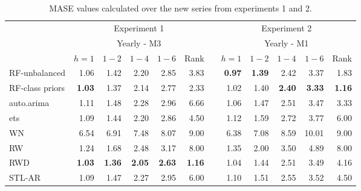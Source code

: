 \documentclass[11pt,a4paper,]{article}
\theoremstyle{definition}
\theoremstyle{definition}
\theoremstyle{definition}
\theoremstyle{remark}
\begin{document}
\begin{table}[!htbp]
\centering\footnotesize
\centering
\caption{MASE values calculated over the new series from experiments 1 and 2.}
\label{masetab}
\begin{tabular}{lrrrrrrrrrrr}
\toprule
                     &                              \multicolumn{ 5}{c}{Experiment 1} &            &                              \multicolumn{ 5}{c}{Experiment 2} \\\cmidrule(lr){2-6} \cmidrule(lr){8-12}
                     &                                    \multicolumn{ 5}{c}{Yearly - M3} &            &                                    \multicolumn{ 5}{c}{Yearly - M1} \\
                     &   $h=1$    &    $1-2$   &     $1-4$  &     $1-6$  &      Rank  &            &     $h=1$  &    $1-2$   &     $1-4$  &     $1-6$  &   Rank \\\cmidrule(lr){2-6} \cmidrule(lr){8-12}
RF-unbalanced        &       1.06 &       1.42 &       2.20 &       2.85 &       3.83 &            & {\bf 0.97} & {\bf 1.39} &       2.42 &       3.37 &        1.83 \\
RF-class priors      & {\bf 1.03} &       1.37 &       2.14 &       2.77 &       2.33 &            &       1.02 &       1.40 & {\bf 2.40} & {\bf 3.33} & {\bf 1.16} \\
auto.arima           &       1.11 &       1.48 &       2.28 &       2.96 &       6.66 &            &       1.06 &       1.47 &       2.51 &       3.47 &       3.33 \\
ets                  &       1.09 &       1.44 &       2.20 &       2.86 &       4.50 &            &       1.12 &       1.59 &       2.72 &       3.77 &       6.00 \\
WN                   &       6.54 &       6.91 &       7.48 &       8.07 &       9.00 &            &       6.38 &       7.08 &       8.59 &      10.01 &       9.00 \\
RW                   &       1.24 &       1.68 &       2.48 &       3.17 &       8.00 &            &       1.35 &       2.00 &       3.50 &       4.89 &       8.00 \\
RWD                  & {\bf 1.03} & {\bf 1.36} & {\bf 2.05} & {\bf 2.63} & {\bf 1.16} &            &       1.04 &       1.44 &       2.51 &       3.49 &       4.16 \\
STL-AR               &       1.09 &       1.47 &       2.27 &       2.95 &       6.00 &            &       1.10 &       1.51 &       2.55 &       3.52 &       4.50 \\

\end{tabular}
\end{table}
\end{document}
